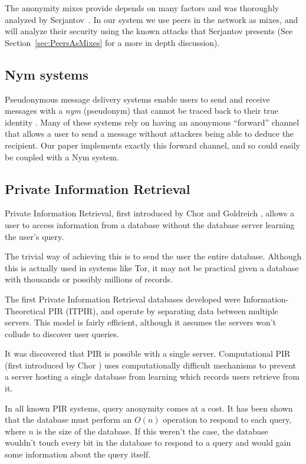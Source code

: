 \documentclass[twocolumn,11pt,english]{article}
\begin{document}
The anonymity mixes provide depends on many factors and was thoroughly analyzed by Serjantov~\cite{trickle02}. In our system we use peers in the network as mixes, and will analyze their security using the known attacks that Serjantov presents (See Section~\ref{sec:PeersAsMixes} for a more in depth discussion). 

\subsection{Nym systems} Pseudonymous message delivery systems enable users to send and receive messages with a \textit{nym} (pseudonym) that cannot be traced back to their true identity \cite{sassaman:wpes2005}. Many of these systems rely on having an anonymous ``forward'' channel that allows a user to send a message without attackers being able to deduce the recipient. Our paper implements exactly this forward channel, and so could easily be coupled with a Nym system. 

\subsection{Private Information Retrieval} 

Private Information Retrieval, first introduced by Chor and Goldreich \cite{pir}, allows a user to access information from a database without the database server learning the user's query. 

The trivial way of achieving this is to send the user the entire database. Although this is actually used in systems like Tor\cite{tor-design}, it may not be practical given a database with thousands or possibly millions of records.

The first Private Information Retrieval databases developed were  Information-Theoretical PIR (ITPIR), and operate by separating data between multiple servers\cite{pir}. This model is fairly efficient, although it assumes the servers won't collude to discover user queries. 

It was discovered that PIR is possible with a single server. Computational PIR (first introduced by Chor \cite{CPIR}) uses computationally difficult mechanisms to prevent a server hosting a single database from learning which records users retrieve from it. 

In all known PIR systems, query anonymity comes at a cost. It has been shown that the database must perform an $O(n)$ operation to respond to each query\cite{CPIR}, where $n$ is the size of the database. If this weren't the case, the database wouldn't touch every bit in the database to respond to a query and would gain some information about the query itself. 
\end{document}

